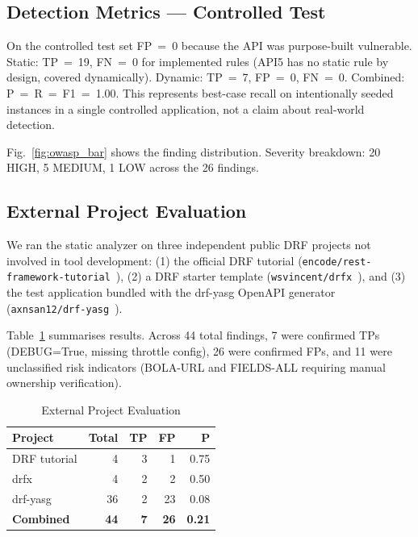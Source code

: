 \documentclass[conference]{IEEEtran}
\begin{document}
\subsection{Detection Metrics — Controlled Test}

On the controlled test set FP~=~0 because the API was purpose-built vulnerable.
Static: TP~=~19, FN~=~0 for implemented rules (API5 has no static rule by design,
covered dynamically). Dynamic: TP~=~7, FP~=~0, FN~=~0.
Combined: P~=~R~=~F1~=~1.00. This represents best-case recall on intentionally
seeded instances in a single controlled application, not a claim about
real-world detection.

Fig.~\ref{fig:owasp_bar} shows the finding distribution.
Severity breakdown: 20 HIGH, 5 MEDIUM, 1 LOW across the 26 findings.

\subsection{External Project Evaluation}

We ran the static analyzer on three independent public DRF projects not
involved in tool development: (1) the official DRF tutorial
(\texttt{encode/rest-framework-tutorial}~\cite{drftutorial}), (2) a DRF
starter template (\texttt{wsvincent/drfx}~\cite{drfx}), and (3) the
test application bundled with the drf-yasg OpenAPI generator
(\texttt{axnsan12/drf-yasg}~\cite{drfyasg}).

Table~\ref{tab:exteval} summarises results. Across 44 total findings,
7 were confirmed TPs (DEBUG=True, missing throttle config), 26 were confirmed
FPs, and 11 were unclassified risk indicators (BOLA-URL and FIELDS-ALL requiring
manual ownership verification).

\begin{table}[htbp]
\caption{External Project Evaluation}
\label{tab:exteval}
\centering
\small
\setlength{\tabcolsep}{3pt}
\begin{tabular}{@{}lrrrr@{}}
\toprule
\textbf{Project} & \textbf{Total} & \textbf{TP} & \textbf{FP} & \textbf{P} \\
\midrule
DRF tutorial & 4  & 3  & 1  & 0.75 \\
drfx         & 4  & 2  & 2  & 0.50 \\
drf-yasg     & 36 & 2  & 23 & 0.08 \\
\midrule
\textbf{Combined} & \textbf{44} & \textbf{7} & \textbf{26} & \textbf{0.21} \\
\bottomrule
\end{tabular}
\end{table}
\end{document}
